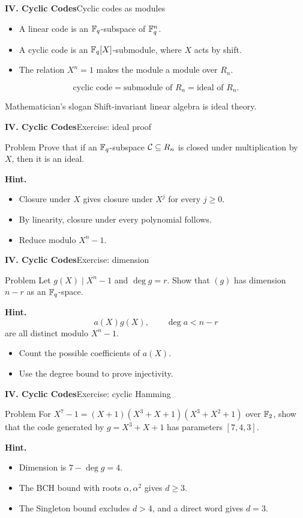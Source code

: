 \begin{frame}{\textbf{IV. Cyclic Codes}}{Cyclic codes as modules}
\small
\begin{itemize}
  \item A linear code is an $\mathbb{F}_q$-subspace of $\mathbb{F}_q^n$.
  \item A cyclic code is an $\mathbb{F}_q[X]$-submodule, where $X$ acts by shift.
  \item The relation $X^n=1$ makes the module a module over $R_n$.
\end{itemize}
\[
  \text{cyclic code}=\text{submodule of }R_n=\text{ideal of }R_n.
\]
\begin{block}{Mathematician's slogan}
Shift-invariant linear algebra is ideal theory.
\end{block}
\end{frame}

\begin{frame}{\textbf{IV. Cyclic Codes}}{Exercise: ideal proof}
\small
\begin{block}{Problem}
Prove that if an $\mathbb{F}_q$-subspace $\mathcal{C}\subseteq R_n$ is closed under multiplication by $X$, then it is an ideal.
\end{block}
\textbf{Hint.}
\begin{itemize}
  \item Closure under $X$ gives closure under $X^j$ for every $j\ge0$.
  \item By linearity, closure under every polynomial follows.
  \item Reduce modulo $X^n-1$.
\end{itemize}
\end{frame}

\begin{frame}{\textbf{IV. Cyclic Codes}}{Exercise: dimension}
\small
\begin{block}{Problem}
Let $g(X)\mid X^n-1$ and $\deg g=r$. Show that $(g)$ has dimension $n-r$ as an $\mathbb{F}_q$-space.
\end{block}
\textbf{Hint.}
\[
  a(X)g(X),\qquad \deg a<n-r
\]
are all distinct modulo $X^n-1$.
\begin{itemize}
  \item Count the possible coefficients of $a(X)$.
  \item Use the degree bound to prove injectivity.
\end{itemize}
\end{frame}

\begin{frame}{\textbf{IV. Cyclic Codes}}{Exercise: cyclic Hamming}
\small
\begin{block}{Problem}
For $X^7-1=(X+1)(X^3+X+1)(X^3+X^2+1)$ over $\mathbb{F}_2$, show that the code generated by $g=X^3+X+1$ has parameters $[7,4,3]$.
\end{block}
\textbf{Hint.}
\begin{itemize}
  \item Dimension is $7-\deg g=4$.
  \item The BCH bound with roots $\alpha,\alpha^2$ gives $d\ge3$.
  \item The Singleton bound excludes $d>4$, and a direct word gives $d=3$.
\end{itemize}
\end{frame}

